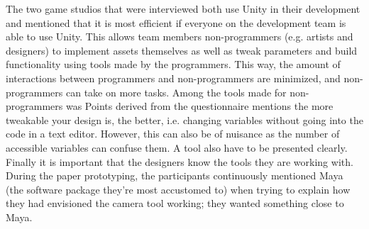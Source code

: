 	The two game studios that were interviewed both use Unity in their development and mentioned that it is most efficient if everyone on the development team is able to use Unity. This allows team members non-programmers (e.g. artists and designers) to implement assets themselves as well as tweak parameters and build functionality using tools made by the programmers. This way, the amount of interactions between programmers and non-programmers are minimized, and non-programmers can take on more tasks.
Among the tools made for non-programmers was 
Points derived from the questionnaire mentions the more tweakable  your design is, the better, i.e. changing variables without going into the code in a text editor. However, this can also be of nuisance as the number of accessible variables can confuse them. A tool also have to be presented clearly. Finally it is important that the designers know the tools they are working with.
During the paper prototyping, the participants continuously mentioned Maya (the software package they're most accustomed to) when trying to explain how they had envisioned the camera tool working; they wanted something close to Maya.
